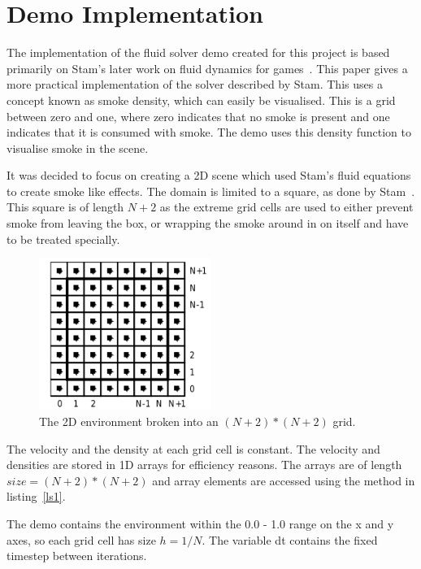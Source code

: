 \section{Demo Implementation}
The implementation of the fluid solver demo created for this project is based primarily on Stam's later work on fluid dynamics for games~\cite{stam2003real}.
This paper gives a more practical implementation of the solver described by Stam.
This uses a concept known as smoke density, which can easily be visualised. 
This is a grid between zero and one, where zero indicates that no smoke is present and one indicates that it is consumed with smoke.
The demo uses this density function to visualise smoke in the scene. 

It was decided to focus on creating a 2D scene which used Stam's fluid equations to create smoke like effects.
The domain is limited to a square, as done by Stam~\cite{stam2003real}.
This square is of length $N+2$ as the extreme grid cells are used to either prevent smoke from leaving the box, or wrapping the smoke around in on itself and have to be treated specially.

\begin{figure}
  \caption{The 2D environment broken into an $(N+2) * (N+2)$ grid.}
  \centering
    \includegraphics[width=0.5\textwidth]{images/grid}
\end{figure}

The velocity and the density at each grid cell is constant.
The velocity and densities are stored in 1D arrays for efficiency reasons.
The arrays are of length $size = (N+2) * (N+2)$ and array elements are accessed using the method in listing~\ref{ls1}.


The demo contains the environment within the 0.0 - 1.0 range on the x and y axes, so each grid cell has size $ h = 1 / N $.
The variable dt contains the fixed timestep between iterations.

